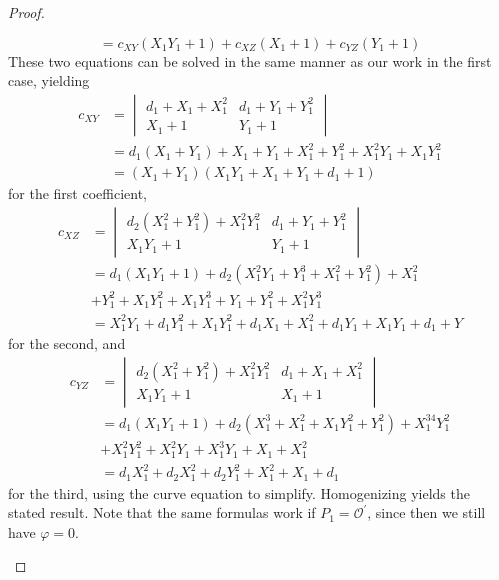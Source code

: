 \begin{proof}
\begin{enumerate}
\[    =   c_{XY}(X_1Y_1 + 1) + c_{XZ}(X_1 + 1) + c_{YZ}(Y_1 + 1)
\]
These two equations can be solved in the same manner as our work in the first
    case, yielding
\begin{align*}
c_{XY}
    &=  \begin{vmatrix}
        d_1 + X_1 + X_1^2   &   d_1 + Y_1 + Y_1^2\\
        X_1 + 1   &   Y_1 + 1
        \end{vmatrix}\\
    &=  d_1(X_1 + Y_1) + X_1 + Y_1 + X_1^2 + Y_1^2 + X_1^2Y_1 + X_1Y_1^2\\
    &=  (X_1 + Y_1)(X_1Y_1 + X_1 + Y_1 + d_1 + 1)
\end{align*}
    for the first coefficient,
\begin{align*}
c_{XZ}
    &=  \begin{vmatrix}
        d_2(X_1^2 + Y_1^2) + X_1^2Y_1^2 &   d_1 + Y_1 + Y_1^2\\
        X_1Y_1 + 1  &   Y_1 + 1
        \end{vmatrix}\\
    &=  d_1(X_1Y_1 + 1) + d_2(X_1^2Y_1 + Y_1^3 + X_1^2 + Y_1^2) + X_1^2\\
    &+ Y_1^2 + X_1Y_1^2 + X_1Y_1^3 + Y_1 + Y_1^2 + X_1^2Y_1^3\\
    &=  X_1^2Y_1 + d_1Y_1^2 + X_1Y_1^2 + d_1X_1 + X_1^2 + d_1Y_1 + X_1Y_1 + d_1
        + Y
\end{align*}
    for the second, and
\begin{align*}
c_{YZ}
    &=  \begin{vmatrix}
        d_2(X_1^2 + Y_1^2) + X_1^2Y_1^2 &   d_1 + X_1 + X_1^2\\
        X_1Y_1 + 1  &   X_1 + 1
        \end{vmatrix}\\
    &=  d_1(X_1Y_1 + 1) + d_2(X_1^3 + X_1^2 + X_1Y_1^2 + Y_1^2) + X_1^34Y_1^2\\
    &+ X_1^2Y_1^2 + X_1^2Y_1 + X_1^3Y_1 + X_1 + X_1^2\\
    &=  d_1X_1^2 + d_2X_1^2 + d_2Y_1^2 + X_1^2 + X_1 + d_1
\end{align*}
    for the third, using the curve equation to simplify.
Homogenizing yields the stated result.
Note that the same formulas work if $P_1 = \mathcal{O}^\prime$, since then we
    still have $\varphi = 0$.\qedhere
\end{enumerate}
\end{proof}

